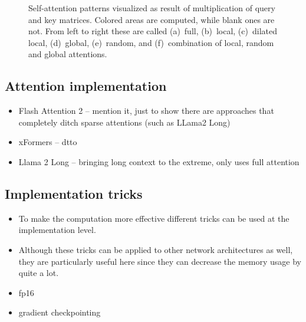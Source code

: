 \begin{figure}
    \caption{Self-attention patterns visualized as result of multiplication of
    query and key matrices. Colored areas are computed, while blank ones are
    not. From left to right these are called (a)~full, (b)~local, (c)~dilated
    local, (d)~global, (e)~random, and (f)~combination of local, random and
    global attentions.}\label{fig:combined}

\end{figure}

\subsubsection{}

\subsection{Attention implementation}

\begin{itemize}

    \item Flash Attention 2 -- mention it, just to show there are approaches that
    completely ditch sparse attentions (such as LLama2 Long)

    \item xFormers -- dtto

    \item Llama 2 Long -- bringing long context to the extreme, only uses full attention

\end{itemize}

\subsection{Implementation tricks}

\begin{itemize}

    \item To make the computation more effective different tricks can be used at
        the implementation level.

    \item Although these tricks can be applied to other network architectures as
        well, they are particularly useful here since they can decrease the
        memory usage by quite a lot.

    \item fp16

    \item gradient checkpointing

\end{itemize}


